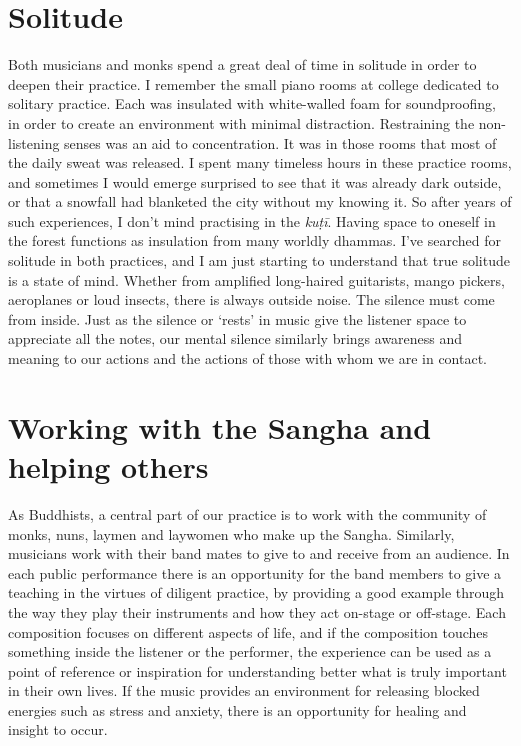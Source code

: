 \section{Solitude}

Both musicians and monks spend a great deal of time in solitude in order
to deepen their practice. I remember the small piano rooms at college
dedicated to solitary practice. Each was insulated with white-walled
foam for soundproofing, in order to create an environment with minimal
distraction. Restraining the non-listening senses was an aid to
concentration. It was in those rooms that most of the daily sweat was
released. I spent many timeless hours in these practice rooms, and
sometimes I would emerge surprised to see that it was already dark
outside, or that a snowfall had blanketed the city without my knowing
it. So after years of such experiences, I don't mind practising in the
\emph{kuṭī}. Having space to oneself in the forest functions as
insulation from many worldly dhammas. I've searched for solitude in both
practices, and I am just starting to understand that true solitude is a
state of mind. Whether from amplified long-haired guitarists, mango
pickers, aeroplanes or loud insects, there is always outside noise. The
silence must come from inside. Just as the silence or `rests' in music
give the listener space to appreciate all the notes, our mental silence
similarly brings awareness and meaning to our actions and the actions of
those with whom we are in contact. 

\section{Working with the Sangha and helping others}

As Buddhists, a central part of our practice is to work with the
community of monks, nuns, laymen and laywomen who make up the Sangha. 
Similarly, musicians work with their band mates to give to and receive
from an audience. In each public performance there is an opportunity for
the band members to give a teaching in the virtues of diligent practice, 
by providing a good example through the way they play their instruments
and how they act on-stage or off-stage. Each composition focuses on
different aspects of life, and if the composition touches something
inside the listener or the performer, the experience can be used as a
point of reference or inspiration for understanding better what is truly
important in their own lives. If the music provides an environment for
releasing blocked energies such as stress and anxiety, there is an
opportunity for healing and insight to occur. 

